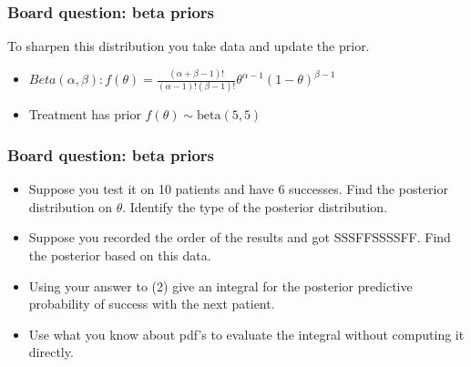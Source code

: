 \documentclass[12pt]{beamer}
\begin{document}
\begin{frame}
	\frametitle{Board question: beta priors}
	To sharpen this distribution you take data and update the prior.
	

	\begin{itemize}[label={\color{blue}$\blacktriangleright$}]
		\item $Beta(\alpha,\beta): f(\theta) = \frac{(\alpha+\beta-1)!}{(\alpha-1)!(\beta-1)!}\theta^{\alpha-1}(1-\theta)^{\beta-1}$
		\item Treatment has prior $f(\theta) \sim \text{beta}(5,5)$
	\end{itemize}
\end{frame}
\begin{frame}
	\frametitle{Board question: beta priors}
	\begin{itemize}[label={\color{blue}$\blacktriangleright$}]
		\item Suppose you test it on 10 patients and have 6 successes. Find the posterior distribution on $\theta$. Identify the type of the posterior distribution.
		
		\item Suppose you recorded the order of the results and got SSSFFSSSSFF. Find the posterior based on this data.
		
		\item Using your answer to (2) give an integral for the posterior predictive probability of success with the next patient.
		
		\item Use what you know about pdf's to evaluate the integral without computing it directly.
	\end{itemize}
	
\end{frame}
\end{document}
